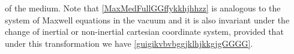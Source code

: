 \documentclass{article}
\theoremstyle{definition}
\theoremstyle{remark}
\newcommand{\er}{\eqref}
\newcommand{\er}{\eqref}
\begin{document}
of the medium. Note that \er{MaxMedFullGGffykkhjhhzz} is analogous
to the system of Maxwell equations in the vacuum and it is also
invariant under the change of inertial or non-inertial cartesian
coordinate system, provided that under this transformation we have
\er{guigikvbvbggjklhjkkgjgGGGG}.
\end{document}
